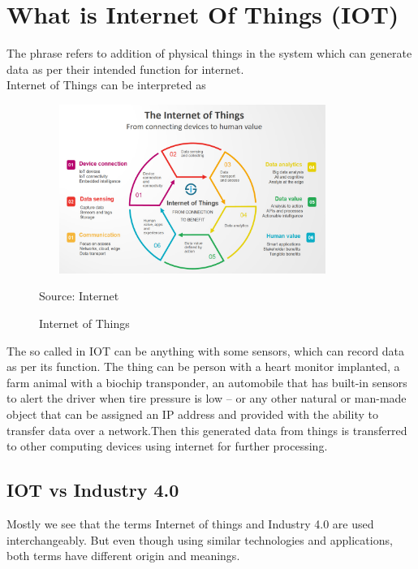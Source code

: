 \documentclass[12pt, a4paper]{report}
\begin{document}
\chapter{What is Internet Of Things (IOT)}
The phrase  refers to addition of physical things in the system which can generate data as per their intended function for internet.\\
Internet of Things can be interpreted as 
\\
\begin{figure}[h]
\centering
\includegraphics[width=10cm, height=5.5cm]{IOT}
\caption{Internet of Things}{Source: Internet}
\label{figure-2}
\end{figure}
The so called  in IOT can be anything with some sensors, which can record data as per its function. The thing can be person with a heart monitor implanted, a farm animal with a biochip transponder, an automobile that has built-in sensors to alert the driver when tire pressure is low -- or any other natural or man-made object that can be assigned an IP address and provided with the ability to transfer data over a network.Then this generated data from things is transferred to other computing devices using internet for further processing.
\section{IOT vs Industry 4.0}
Mostly we see that the terms Internet of things and Industry 4.0 are used interchangeably. But even though using similar technologies and applications, both terms have different origin and meanings.
\end{document}

